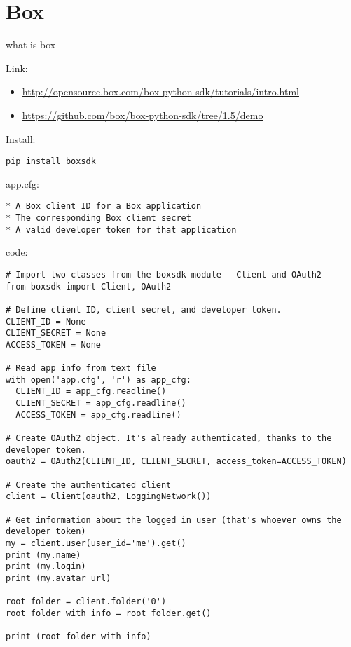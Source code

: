 \section{Box}\label{box}

what is box

Link:

\begin{itemize}
\tightlist
\item
  \url{http://opensource.box.com/box-python-sdk/tutorials/intro.html}
\item
  \url{https://github.com/box/box-python-sdk/tree/1.5/demo}
\end{itemize}

Install:

\begin{verbatim}
pip install boxsdk
\end{verbatim}

app.cfg:

\begin{verbatim}
* A Box client ID for a Box application
* The corresponding Box client secret
* A valid developer token for that application
\end{verbatim}

code:

\begin{verbatim}
# Import two classes from the boxsdk module - Client and OAuth2
from boxsdk import Client, OAuth2

# Define client ID, client secret, and developer token.
CLIENT_ID = None
CLIENT_SECRET = None
ACCESS_TOKEN = None

# Read app info from text file
with open('app.cfg', 'r') as app_cfg:
  CLIENT_ID = app_cfg.readline()
  CLIENT_SECRET = app_cfg.readline()
  ACCESS_TOKEN = app_cfg.readline()

# Create OAuth2 object. It's already authenticated, thanks to the developer token.
oauth2 = OAuth2(CLIENT_ID, CLIENT_SECRET, access_token=ACCESS_TOKEN)

# Create the authenticated client
client = Client(oauth2, LoggingNetwork())

# Get information about the logged in user (that's whoever owns the developer token)
my = client.user(user_id='me').get()
print (my.name)
print (my.login)
print (my.avatar_url)

root_folder = client.folder('0')
root_folder_with_info = root_folder.get()

print (root_folder_with_info)
\end{verbatim}

